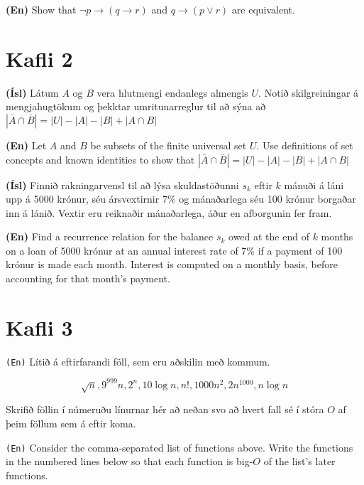 \documentclass[addpoints]{exam}
\begin{document}
\begin{questions}
\textbf{(En)} Show that $\lnot p \to (q \to r)$ and $q \to (p \lor r)$ are equivalent.

\section{Kafli 2}

\question[10]
\textbf{(Ísl)} Látum $A$ og $B$ vera hlutmengi endanlegs almengis $U$. Notið skilgreiningar á mengjahugtökum og þekktar umritunarreglur til að sýna að $|\overline{A} \cap \overline{B}| = |U| - |A| - |B| + |A\cap B|$

\textbf{(En)} Let $A$ and $B$ be subsets of the finite universal set $U$. Use definitions of set concepts and known identities to show that $|\overline{A} \cap \overline{B}| = |U| - |A| - |B| + |A\cap B|$

\question[10]
\textbf{(Ísl)} Finnið rakningarvensl til að lýsa skuldastöðunni $s_k$ eftir $k$ mánuði á láni upp á 5000 krónur, séu ársvextirnir 7\% og mánaðarlega séu 100 krónur borgaðar inn á lánið. Vextir eru reiknaðir mánaðarlega, áður en afborgunin fer fram.

\textbf{(En)} Find a recurrence relation for the balance $s_k$ owed at the end of $k$ months on a loan of 5000 krónur at an annual interest rate of 7\% if a payment of 100 krónur is made each month. Interest is computed on a monthly basis, before accounting for that month's payment.

\section{Kafli 3}

\question[10]
\texttt{(En)} Lítið á eftirfarandi föll, sem eru aðskilin með kommum.

\[
\sqrt{n}, 9^{999} n, 2^n, 10\log n, n!, 1000 n^2, 2 n^{1000}, n \log n
\]

Skrifið föllin í númeruðu línurnar hér að neðan svo að hvert fall sé í stóra $O$ af þeim föllum sem á eftir koma.

\texttt{(En)} Consider the comma-separated list of functions above. Write the functions in the numbered lines below so that each function is big-$O$ of the list's later functions.


\end{questions}
\end{document}
